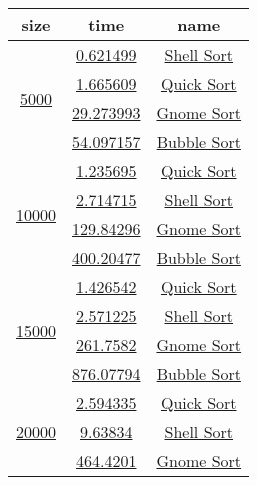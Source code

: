 %

\newsavebox{\sorttime}
\begin{lrbox}{\sorttime}
\begin{tabular}{|c|c|c|}
\hline
\textbf{size} & \textbf{time} & \textbf{name}\\
\hline\hline
 \multirow{4}{*}{\href{T1.3.0}{5000}} & {\href{T1.1.1}{0.621499}} & {\href{T1.1.2}{Shell Sort}}\\
\cline{2-3}
 & {\href{T1.0.1}{1.665609}} & {\href{T1.0.2}{Quick Sort}}\\
\cline{2-3}
 & {\href{T1.3.1}{29.273993}} & {\href{T1.3.2}{Gnome Sort}}\\
\cline{2-3}
 & {\href{T1.2.1}{54.097157}} & {\href{T1.2.2}{Bubble Sort}}\\
\hline
 \multirow{4}{*}{\href{T1.6.0}{10000}} & {\href{T1.4.1}{1.235695}} & {\href{T1.4.2}{Quick Sort}}\\
\cline{2-3}
 & {\href{T1.5.1}{2.714715}} & {\href{T1.5.2}{Shell Sort}}\\
\cline{2-3}
 & {\href{T1.7.1}{129.84296}} & {\href{T1.7.2}{Gnome Sort}}\\
\cline{2-3}
 & {\href{T1.6.1}{400.20477}} & {\href{T1.6.2}{Bubble Sort}}\\
\hline
 \multirow{4}{*}{\href{T1.11.0}{15000}} & {\href{T1.8.1}{1.426542}} & {\href{T1.8.2}{Quick Sort}}\\
\cline{2-3}
 & {\href{T1.9.1}{2.571225}} & {\href{T1.9.2}{Shell Sort}}\\
\cline{2-3}
 & {\href{T1.11.1}{261.7582}} & {\href{T1.11.2}{Gnome Sort}}\\
\cline{2-3}
 & {\href{T1.10.1}{876.07794}} & {\href{T1.10.2}{Bubble Sort}}\\
\hline
 \multirow{4}{*}{\href{T1.13.0}{20000}} & {\href{T1.12.1}{2.594335}} & {\href{T1.12.2}{Quick Sort}}\\
\cline{2-3}
 & {\href{T1.13.1}{9.63834}} & {\href{T1.13.2}{Shell Sort}}\\
\cline{2-3}
 & {\href{T1.15.1}{464.4201}} & {\href{T1.15.2}{Gnome Sort}}\\

\end{tabular}
\end{lrbox}
